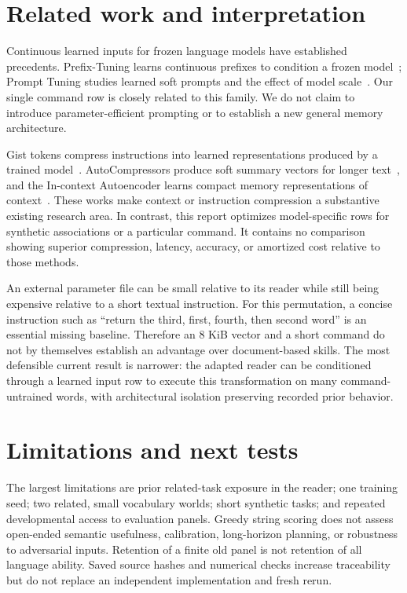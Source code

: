\documentclass[11pt]{article}
\begin{document}
\section{Related work and interpretation}
Continuous learned inputs for frozen language models have established precedents. Prefix-Tuning learns continuous prefixes to condition a frozen model~\cite{prefix}; Prompt Tuning studies learned soft prompts and the effect of model scale~\cite{prompt}. Our single command row is closely related to this family. We do not claim to introduce parameter-efficient prompting or to establish a new general memory architecture.

Gist tokens compress instructions into learned representations produced by a trained model~\cite{gist}. AutoCompressors produce soft summary vectors for longer text~\cite{auto}, and the In-context Autoencoder learns compact memory representations of context~\cite{icae}. These works make context or instruction compression a substantive existing research area. In contrast, this report optimizes model-specific rows for synthetic associations or a particular command. It contains no comparison showing superior compression, latency, accuracy, or amortized cost relative to those methods.

An external parameter file can be small relative to its reader while still being expensive relative to a short textual instruction. For this permutation, a concise instruction such as ``return the third, first, fourth, then second word'' is an essential missing baseline. Therefore an 8 KiB vector and a short command do not by themselves establish an advantage over document-based skills. The most defensible current result is narrower: the adapted reader can be conditioned through a learned input row to execute this transformation on many command-untrained words, with architectural isolation preserving recorded prior behavior.

\section{Limitations and next tests}
The largest limitations are prior related-task exposure in the reader; one training seed; two related, small vocabulary worlds; short synthetic tasks; and repeated developmental access to evaluation panels. Greedy string scoring does not assess open-ended semantic usefulness, calibration, long-horizon planning, or robustness to adversarial inputs. Retention of a finite old panel is not retention of all language ability. Saved source hashes and numerical checks increase traceability but do not replace an independent implementation and fresh rerun.
\end{document}
